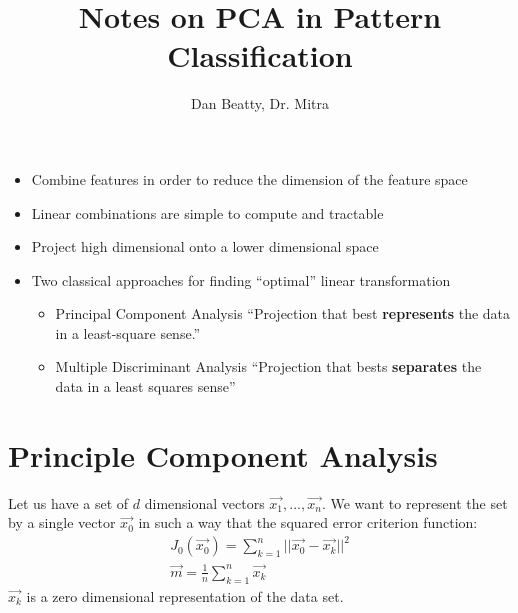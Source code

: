 \documentclass[11pt]{article}
\title{Notes on PCA in Pattern Classification}
\author{Dan Beatty, Dr. Mitra}
\begin{document}
\maketitle


\begin{itemize}
	\item Combine features in order to reduce the dimension of the feature space
	\item Linear combinations are simple to compute and tractable 
	\item Project high dimensional onto a lower dimensional space
	\item Two classical approaches for finding ``optimal'' linear transformation
	\begin{itemize}
		\item Principal Component Analysis ``Projection that best \textbf{represents} the data in a least-square sense.'' 
		\item Multiple Discriminant Analysis ``Projection that bests \textbf{separates} the data in a least squares sense''
	\end{itemize}
	
\end{itemize}

\section{Principle Component Analysis}
Let us have a set of $d$ dimensional vectors $\vec{x_1} , ..., \vec{x_n}$.  We want to represent the set by a single vector $\vec{x_0}$ in such a way that the squared error criterion function:
\begin{eqnarray}
	J_0 (\vec{x_0}) = \sum_{k=1} ^n  ||\vec{x_0} - \vec{x_k} ||^2 \\
	\vec{m} = \frac{1}{n} \sum_{k=1}^n \vec{x_k}
\end{eqnarray}
$\vec{x_k}$ is a zero dimensional representation of the data set.  
\end{document}
